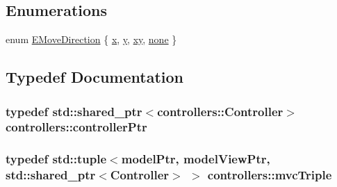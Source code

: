 \subsection*{\-Enumerations}
\begin{DoxyCompactItemize}
\item 
enum \hyperlink{namespacecontrollers_aebbb0610800fdb6dd92c2904e0de1c2f}{\-E\-Move\-Direction} \{ \hyperlink{namespacecontrollers_aebbb0610800fdb6dd92c2904e0de1c2fa26de7184e3b3fe1d6dd44536f0b28812}{x}, 
\hyperlink{namespacecontrollers_aebbb0610800fdb6dd92c2904e0de1c2fa2285ac806535d815cc3cc194efc6651f}{y}, 
\hyperlink{namespacecontrollers_aebbb0610800fdb6dd92c2904e0de1c2fac46d7418488c39238f293626b89ec5c4}{xy}, 
\hyperlink{namespacecontrollers_aebbb0610800fdb6dd92c2904e0de1c2fa73c0526e372af131bdf90d5b56456915}{none}
 \}
\end{DoxyCompactItemize}


\subsection{\-Typedef \-Documentation}
\hypertarget{namespacecontrollers_ab74cf2ed38c0b0460698b4eb6fe8bec5}{
\subsubsection[{controller\-Ptr}]{\setlength{\rightskip}{0pt plus 5cm}typedef std\-::shared\-\_\-ptr$<${\bf controllers\-::\-Controller}$>$ {\bf controllers\-::controller\-Ptr}}}\label{de/d2c/namespacecontrollers_ab74cf2ed38c0b0460698b4eb6fe8bec5}
\hypertarget{namespacecontrollers_afa9121480272f6c66b98dfad7aa403d3}{
\subsubsection[{mvc\-Triple}]{\setlength{\rightskip}{0pt plus 5cm}typedef std\-::tuple$<${\bf model\-Ptr}, {\bf model\-View\-Ptr}, std\-::shared\-\_\-ptr$<${\bf \-Controller}$>$ $>$ {\bf controllers\-::mvc\-Triple}}}\label{de/d2c/namespacecontrollers_afa9121480272f6c66b98dfad7aa403d3}


